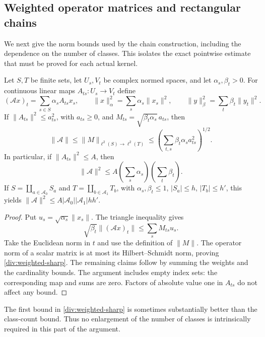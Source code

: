 \subsection{Weighted operator matrices and rectangular chains}

We next give the norm bounds used by the chain construction, including
the dependence on the number of classes. This isolates the exact
pointwise estimate that must be proved for each actual kernel.

\begin{lemma}\label{div:weighted-matrix}
Let $S,T$ be finite sets, let $U_s,V_t$ be complex normed spaces, and
let $\alpha_s,\beta_t>0$. For continuous linear maps
$A_{ts}:U_s\to V_t$ define
\[
 (\mathcal A x)_t=\sum_{s\in S}\alpha_s A_{ts}x_s,
 \qquad \|x\|_\alpha^2=\sum_s\alpha_s\|x_s\|^2,
 \qquad \|y\|_\beta^2=\sum_t\beta_t\|y_t\|^2.
\]
If $\|A_{ts}\|^2\le a_{ts}^2$, with $a_{ts}\ge0$, and
$M_{ts}=\sqrt{\beta_t\alpha_s}\,a_{ts}$, then
\begin{equation}\label{div:weighted-sharp}
 \|\mathcal A\|\le\|M\|_{\ell^2(S)\to\ell^2(T)}
       \le\left(\sum_{t,s}\beta_t\alpha_s a_{ts}^2\right)^{1/2}.
\end{equation}
In particular, if $\|A_{ts}\|^2\le A$, then
\begin{equation}\label{div:weighted-coarse}
 \|\mathcal A\|^2\le A\left(\sum_s\alpha_s\right)
                           \left(\sum_t\beta_t\right).
\end{equation}
If $S=\coprod_{a\in\mathcal A_0}S_a$ and
$T=\coprod_{b\in\mathcal A_1}T_b$, with
$\alpha_s,\beta_t\le1$, $|S_a|\le h$, $|T_b|\le h'$, this yields
$\|\mathcal A\|^2\le A|\mathcal A_0||\mathcal A_1|hh'$.
\end{lemma}
\begin{proof}
Put $u_s=\sqrt{\alpha_s}\|x_s\|$. The triangle inequality gives
\[
 \sqrt{\beta_t}\| (\mathcal A x)_t\|
       \le\sum_sM_{ts}u_s.
\]
Take the Euclidean norm in $t$ and use the definition of $\|M\|$.
The operator norm of a scalar matrix is at most its Hilbert--Schmidt
norm, proving \eqref{div:weighted-sharp}. The remaining claims follow
by summing the weights and the cardinality bounds. The argument includes
empty index sets: the corresponding map and sums are zero. Factors of
absolute value one in $A_{ts}$ do not affect any bound.
\end{proof}

The first bound in \eqref{div:weighted-sharp} is sometimes substantially
better than the class-count bound. Thus no enlargement of the number of
classes is intrinsically required in this part of the argument.

